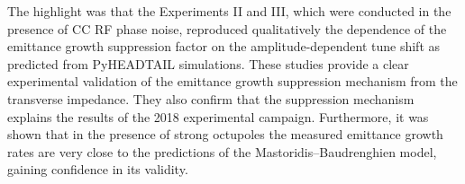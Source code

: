 The highlight was that the Experiments II and III, which were conducted in the presence of CC RF phase noise, reproduced qualitatively the dependence of the emittance growth suppression factor on the amplitude-dependent tune shift as predicted from PyHEADTAIL simulations. These studies provide a clear experimental validation of the emittance growth suppression mechanism from the transverse impedance. They also confirm that the suppression mechanism explains the results of the 2018 experimental campaign. Furthermore, it was shown that in the presence of strong octupoles the measured emittance growth rates are very close to the predictions of the Mastoridis--Baudrenghien model, gaining confidence in its validity. %








